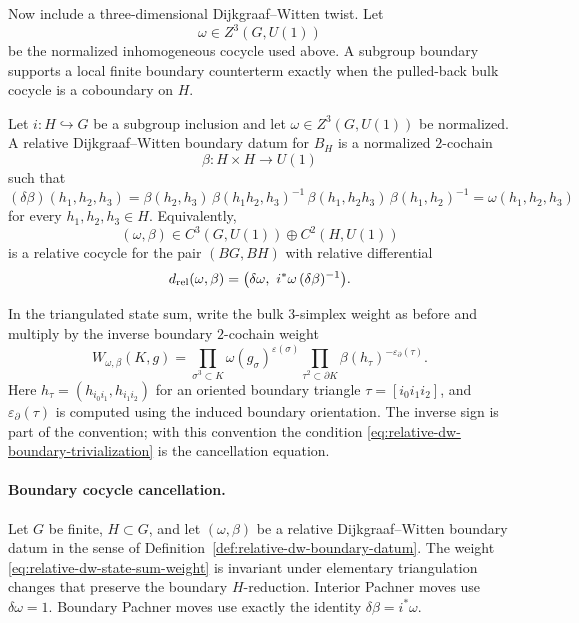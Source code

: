 Now include a three-dimensional Dijkgraaf--Witten twist.  Let
\[
  \omega\in Z^3(G,U(1))
\]
be the normalized inhomogeneous cocycle used above.  A subgroup boundary
supports a local finite boundary counterterm exactly when the pulled-back
bulk cocycle is a coboundary on \(H\).

\begin{definition}
\label{def:relative-dw-boundary-datum}
Let \(i:H\hookrightarrow G\) be a subgroup inclusion and let
\(\omega\in Z^3(G,U(1))\) be normalized.  A relative Dijkgraaf--Witten
boundary datum for \(B_H\) is a normalized \(2\)-cochain
\[
  \beta:H\times H\to U(1)
\]
such that
\begin{equation}
  (\delta\beta)(h_1,h_2,h_3)
  =
  \beta(h_2,h_3)\,
  \beta(h_1h_2,h_3)^{-1}\,
  \beta(h_1,h_2h_3)\,
  \beta(h_1,h_2)^{-1}
  =
  \omega(h_1,h_2,h_3)
  \label{eq:relative-dw-boundary-trivialization}
\end{equation}
for every \(h_1,h_2,h_3\in H\).  Equivalently,
\[
  (\omega,\beta)\in C^3(G,U(1))\oplus C^2(H,U(1))
\]
is a relative cocycle for the pair \((BG,BH)\) with relative differential
\[
  d_{\rm rel}(\omega,\beta)
  =
  \bigl(\delta\omega,\ i^*\omega\,(\delta\beta)^{-1}\bigr).
\]
\end{definition}

In the triangulated state sum, write the bulk \(3\)-simplex weight as before
and multiply by the inverse boundary \(2\)-cochain weight
\begin{equation}
  W_{\omega,\beta}(K,g)
  =
  \prod_{\sigma^3\subset K}
    \omega(g_\sigma)^{\varepsilon(\sigma)}
  \prod_{\tau^2\subset\partial K}
    \beta(h_\tau)^{-\varepsilon_\partial(\tau)}.
  \label{eq:relative-dw-state-sum-weight}
\end{equation}
Here \(h_\tau=(h_{i_0i_1},h_{i_1i_2})\) for an oriented boundary triangle
\(\tau=[i_0i_1i_2]\), and \(\varepsilon_\partial(\tau)\) is computed using
the induced boundary orientation.  The inverse sign is part of the
convention; with this convention the condition
\eqref{eq:relative-dw-boundary-trivialization} is the cancellation equation.

\paragraph{Boundary cocycle cancellation.}
Let \(G\) be finite, \(H\subset G\), and let
\((\omega,\beta)\) be a relative Dijkgraaf--Witten boundary datum in the
sense of Definition~\ref{def:relative-dw-boundary-datum}.  The weight
\eqref{eq:relative-dw-state-sum-weight} is invariant under elementary
triangulation changes that preserve the boundary \(H\)-reduction.  Interior
Pachner moves use \(\delta\omega=1\).  Boundary Pachner moves use exactly the
identity \(\delta\beta=i^*\omega\).

